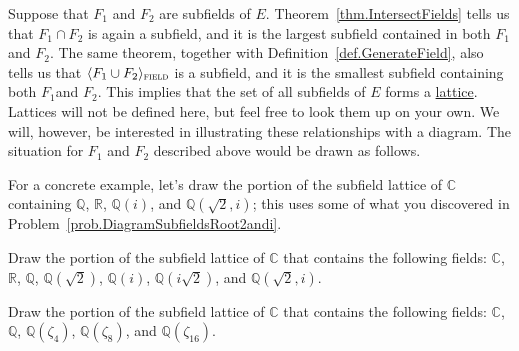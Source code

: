 Suppose that $F_1$ and $F_2$ are subfields of $E$. Theorem~\ref{thm.IntersectFields} tells us that $F_1\cap F_2$ is again a subfield, and it is the largest subfield contained in both $F_1$ and $F_2$. The same theorem, together with Definition~\ref{def.GenerateField}, also tells us that $\langle F_1\cup F_2 \rangle_{\textsc{field}}$ is a subfield, and it is the smallest subfield containing both $F_1$and $F_2$. This implies that the set of all subfields of $E$ forms a \href{https://en.wikipedia.org/wiki/Lattice_(order)}{lattice}. Lattices will not be defined here, but feel free to look them up on your own. We will, however, be interested in illustrating these relationships with a diagram. The situation for $F_1$ and $F_2$ described above would be drawn as follows.
\begin{center}
\end{center}

For a concrete example, let's draw the portion of the subfield lattice of $\mathbb{C}$ containing $\mathbb{Q}$, $\mathbb{R}$, $\mathbb{Q}(i)$, and $\mathbb{Q}\left(\sqrt{2},i\right)$; this uses some of what you discovered in Problem~\ref{prob.DiagramSubfieldsRoot2andi}.

\begin{center}
\end{center}

\begin{problem}\label{prob.LatticeSubfieldsRoot2andi}
Draw the portion of the subfield lattice of $\mathbb{C}$ that contains the following fields:
$\mathbb{C}$, $\mathbb{R}$, $\mathbb{Q}$, $\mathbb{Q}\left(\sqrt{2}\right)$, $\mathbb{Q}(i)$, $\mathbb{Q}\left(i\sqrt{2}\right)$, and $\mathbb{Q}\left(\sqrt{2},i\right)$.
\end{problem}

\begin{problem}
Draw the portion of the subfield lattice of $\mathbb{C}$ that contains the following fields:
$\mathbb{C}$, $\mathbb{Q}$, $\mathbb{Q}(\zeta_4)$, $\mathbb{Q}(\zeta_8)$, and $\mathbb{Q}(\zeta_{16})$.
\end{problem}

